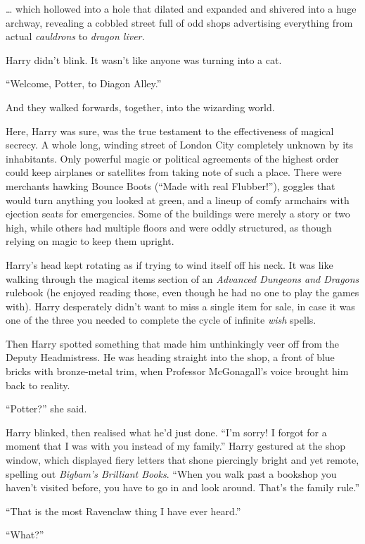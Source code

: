 … which hollowed into a hole that dilated and expanded and
shivered into a huge archway, revealing a cobbled street full of
odd shops advertising everything from actual \emph{cauldrons} to
\emph{dragon liver.}

Harry didn’t blink. It wasn’t like anyone was turning into a cat.

“Welcome, Potter, to Diagon Alley.”

And they walked forwards, together, into the wizarding world.

Here, Harry was sure, was the true testament to the
effectiveness of magical secrecy. A whole long, winding
street of London City completely unknown by its
inhabitants. Only powerful magic or political agreements of
the highest order could keep airplanes or satellites from
taking note of such a place. There were merchants hawking
Bounce Boots (“Made with real Flubber!”),
goggles that would turn anything you looked at green, and
a lineup of comfy armchairs with ejection seats for
emergencies. Some of the buildings were merely a story
or two high, while others had multiple floors and were
oddly structured, as though relying on magic to keep them upright.

Harry’s head kept rotating as if trying to wind itself off his
neck. It was like walking through the magical items section of an
\emph{Advanced Dungeons and Dragons} rulebook (he enjoyed
reading those, even though he had no one
to play the games with). Harry desperately didn’t want to miss a
single item for sale, in case it was one of the three you needed to complete
the cycle of infinite \emph{wish} spells.

Then Harry spotted something that made him unthinkingly
veer off from the Deputy Headmistress.
He was heading straight into the shop, a front of blue bricks
with bronze-metal trim, when Professor McGonagall’s voice
brought him back to reality.

“Potter?” she said.

Harry blinked, then realised what he’d just done. “I’m sorry! I forgot for a
moment that I was with you instead of my family.” Harry gestured at the shop
window, which displayed fiery letters that shone piercingly bright and yet
remote, spelling out \emph{Bigbam’s Brilliant Books}. “When you walk past a
bookshop you haven’t visited before, you have to go in and look around. That’s
the family rule.”

“That is the most Ravenclaw thing I have ever heard.”

“What?”


